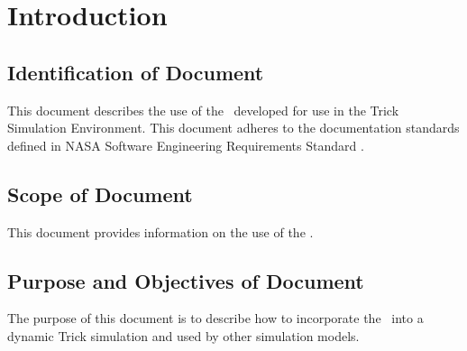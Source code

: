 \documentclass[twoside,11pt,titlepage]{report}
\begin{document}

\date{DATE}
\modelname{\MODEL}
\author{YOUR NAME}
\makeTrickhlaenvTitlepage



\tableofcontents
\vfill

\pagebreak


\chapter{Introduction}\label{sec:intro}



\section{Identification of Document}
This document describes the use of the
\MODEL\ developed for use in the Trick Simulation Environment.
This document adheres to the documentation standards defined in
NASA Software Engineering Requirements Standard \cite{NASA:SWE}.

\section{Scope of Document}
This document provides information on the use of the \MODEL.

\section{Purpose and Objectives of Document}
The purpose of this document is to describe how to incorporate the
\MODEL\ into a dynamic Trick simulation and used by other simulation models.
\end{document}
